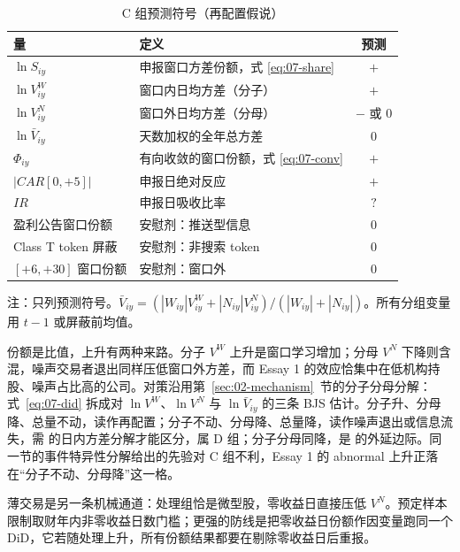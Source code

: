 \documentclass[a4paper,11pt]{ctexart}
\begin{document}
\begin{table}[htbp]
\centering
\caption{C 组预测符号（再配置假说）}
\label{tab:07-predictions}
\begin{threeparttable}
\begin{tabular}{llc}
\toprule
量 & 定义 & 预测 \\
\midrule
$\ln S_{iy}$ & 申报窗口方差份额，式 \eqref{eq:07-share} & $+$ \\
$\ln V^{W}_{iy}$ & 窗口内日均方差（分子） & $+$ \\
$\ln V^{N}_{iy}$ & 窗口外日均方差（分母） & $-$ 或 $0$ \\
$\ln \bar V_{iy}$ & 天数加权的全年总方差 & $0$ \\
$\Phi_{iy}$ & 有向收敛的窗口份额，式 \eqref{eq:07-conv} & $+$ \\
$|CAR[0,+5]|$ & 申报日绝对反应 & $+$ \\
$IR$ & 申报日吸收比率 & $?$ \\
\midrule
盈利公告窗口份额 & 安慰剂：推送型信息 & $0$ \\
Class T token 屏蔽 & 安慰剂：非搜索 token & $0$ \\
$[+6,+30]$ 窗口份额 & 安慰剂：窗口外 & $0$ \\
\bottomrule
\end{tabular}
\begin{tablenotes}\footnotesize
\item 注：只列预测符号。$\bar V_{iy}=(|W_{iy}|V^{W}_{iy}+|N_{iy}|V^{N}_{iy})/(|W_{iy}|+|N_{iy}|)$。所有分组变量用 $t-1$ 或屏蔽前均值。
\end{tablenotes}
\end{threeparttable}
\end{table}

份额是比值，上升有两种来路。分子 $V^{W}$ 上升是窗口学习增加；分母 $V^{N}$ 下降则含混，噪声交易者退出同样压低窗口外方差\citep{peressschmidt2020}，而 Essay 1 的效应恰集中在低机构持股、噪声占比高的公司。对策沿用第~\ref{sec:02-mechanism}~节的分子分母分解：式~\eqref{eq:07-did} 拆成对 $\ln V^{W}$、$\ln V^{N}$ 与 $\ln \bar V_{iy}$ 的三条 BJS 估计。分子升、分母降、总量不动，读作再配置；分子不动、分母降、总量降，读作噪声退出或信息流失，需 \citet{brogaardetal2022} 的日内方差分解才能区分，属 D 组；分子分母同降，是 \citet{grossmanstiglitz1980} 的外延边际。同一节的事件特异性分解给出的先验对 C 组不利，Essay 1 的 abnormal 上升正落在“分子不动、分母降”这一格。

薄交易是另一条机械通道：处理组恰是微型股，零收益日直接压低 $V^{N}$。预定样本限制取财年内非零收益日数门槛；更强的防线是把零收益日份额作因变量跑同一个 DiD，它若随处理上升，所有份额结果都要在剔除零收益日后重报。
\end{document}
